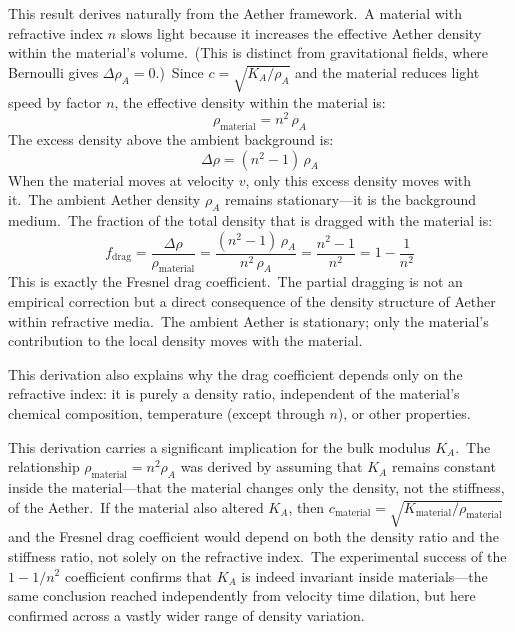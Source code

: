 ﻿\documentclass[12pt,letterpaper]{article}
\newcommand{\rhoa}{\rho_{\!A}}
\newcommand{\Ka}{K_{\!A}}
\begin{document}
This result derives naturally from the Aether framework.\ A material with refractive index
$n$ slows light because it increases the effective Aether density within the material's
volume.\ (This is distinct from gravitational fields, where Bernoulli gives
$\Delta\rhoa = 0$.)\ Since $c = \sqrt{\Ka / \rhoa}$ and the material reduces light speed
by factor $n$,
the effective density within the material is:
%
\begin{equation}
  \rho_{\mathrm{material}} = n^2 \, \rhoa
\end{equation}
%
The excess density above the ambient background is:
%
\begin{equation}
  \Delta\rho = (n^2 - 1)\,\rhoa
\end{equation}
%
When the material moves at velocity $v$, only this excess density moves with it.\ The ambient
Aether density $\rhoa$ remains stationary---it is the background medium.\ The fraction of
the total density that is dragged with the material is:
%
\begin{equation}
  f_{\mathrm{drag}} = \frac{\Delta\rho}{\rho_{\mathrm{material}}} = \frac{(n^2 - 1)\,\rhoa}{n^2\,\rhoa}
    = \frac{n^2 - 1}{n^2} = 1 - \frac{1}{n^2}
\end{equation}
%
This is exactly the Fresnel drag coefficient.\ The partial dragging is not an empirical
correction but a direct consequence of the density structure of Aether within refractive
media.\ The ambient Aether is stationary; only the material's contribution to the local
density moves with the material.

This derivation also explains why the drag coefficient depends only on the refractive
index: it is purely a density ratio, independent of the material's chemical composition,
temperature (except through $n$), or other properties.

This derivation carries a significant implication for the bulk modulus $\Ka$.\ The
relationship $\rho_{\mathrm{material}} = n^2 \rhoa$ was derived by assuming that $\Ka$ remains constant
inside the material---that the material changes only the density, not the stiffness, of
the Aether.\ If the material also altered $\Ka$, then $c_{\mathrm{material}} = \sqrt{K_{\mathrm{material}} /
\rho_{\mathrm{material}}}$ and the Fresnel drag coefficient would depend on both the density ratio and
the stiffness ratio, not solely on the refractive index.\ The experimental success of the
$1 - 1/n^2$ coefficient confirms that $\Ka$ is indeed invariant inside materials---the same
conclusion reached independently from velocity time dilation, but here confirmed across
a vastly wider range of density variation.
\end{document}
